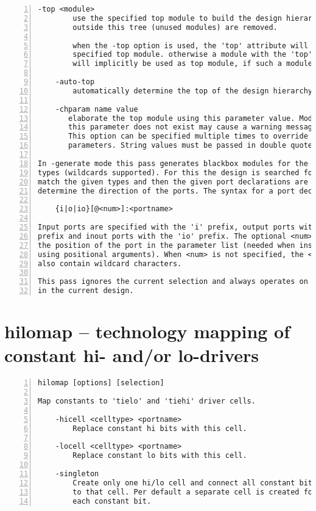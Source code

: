 \begin{lstlisting}[numbers=left,frame=single]
    -top <module>
        use the specified top module to build the design hierarchy. Modules
        outside this tree (unused modules) are removed.

        when the -top option is used, the 'top' attribute will be set on the
        specified top module. otherwise a module with the 'top' attribute set
        will implicitly be used as top module, if such a module exists.

    -auto-top
        automatically determine the top of the design hierarchy and mark it.

    -chparam name value 
       elaborate the top module using this parameter value. Modules on which
       this parameter does not exist may cause a warning message to be output.
       This option can be specified multiple times to override multiple
       parameters. String values must be passed in double quotes (").

In -generate mode this pass generates blackbox modules for the given cell
types (wildcards supported). For this the design is searched for cells that
match the given types and then the given port declarations are used to
determine the direction of the ports. The syntax for a port declaration is:

    {i|o|io}[@<num>]:<portname>

Input ports are specified with the 'i' prefix, output ports with the 'o'
prefix and inout ports with the 'io' prefix. The optional <num> specifies
the position of the port in the parameter list (needed when instantiated
using positional arguments). When <num> is not specified, the <portname> can
also contain wildcard characters.

This pass ignores the current selection and always operates on all modules
in the current design.
\end{lstlisting}

\section{hilomap -- technology mapping of constant hi- and/or lo-drivers}
\label{cmd:hilomap}
\begin{lstlisting}[numbers=left,frame=single]
    hilomap [options] [selection]

Map constants to 'tielo' and 'tiehi' driver cells.

    -hicell <celltype> <portname>
        Replace constant hi bits with this cell.

    -locell <celltype> <portname>
        Replace constant lo bits with this cell.

    -singleton
        Create only one hi/lo cell and connect all constant bits
        to that cell. Per default a separate cell is created for
        each constant bit.
\end{lstlisting}

